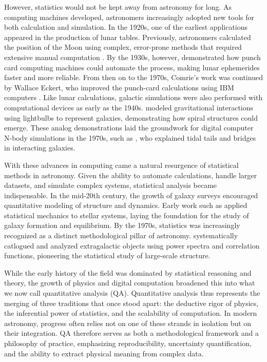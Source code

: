 \documentclass[preprint,longauthor]{aastex631}
\numberwithin{equation}{section}
\begin{document}
However, statistics would not be kept away from astronomy for long. As computing machines developed, astronomers increasingly adopted new tools for both calculation and simulation. In the 1920s, one of the earliest applications appeared in the production of lunar tables. Previously, astronomers calculated the position of the Moon using complex, error-prone methods that required extensive manual computation \citep{duncombeEarlyApplicationsComputer1988}. By the 1930s, however, \citet{comrieApplicationHollerithTabulating1932} demonstrated how punch card computing machines could automate the process, making lunar ephemerides faster and more reliable. From then on to the 1970s, Comrie's work was continued by Wallace Eckert, who improved the punch-card calculations using IBM computers \citep{olleyTaskThatExceeded2018}. Like lunar calculations, galactic simulations were also performed with computational devices as early as the 1940s. \citet{holmbergClusteringTendenciesNebulae1940} modeled gravitational interactions using lightbulbs to represent galaxies, demonstrating how spiral structures could emerge. These analog demonstrations laid the groundwork for digital computer N-body simulations in the 1970s, such as \citet{toomreGalacticBridgesTails1972}, who explained tidal tails and bridges in interacting galaxies.

With these advances in computing came a natural resurgence of statistical methods in astronomy. Given the ability to automate calculations, handle larger datasets, and simulate complex systems, statistical analysis became indispensable. In the mid-20th century, the growth of galaxy surveys encouraged quantitative modeling of structure and dynamics. Early work such as \citet{lynden-bellStatisticalMechanicsViolent1967} applied statistical mechanics to stellar systems, laying the foundation for the study of galaxy formation and equilibrium. By the 1970s, statistics was increasingly recognized as a distinct methodological pillar of astronomy. \citet{peeblesStatisticalAnalysisCatalogs1973} systematically catlogued and analyzed extragalactic objects using power spectra and correlation functions, pioneering the statistical study of large-scale structure.

While the early history of the field was dominated by statistical reasoning and theory, the growth of physics and digital computation broadened this into what we now call quantitative analysis (QA). Quantitative analysis thus represents the merging of three traditions that once stood apart: the deductive rigor of physics, the inferential power of statistics, and the scalability of computation. In modern astronomy, progress often relies not on one of these strands in isolation but on their integration. QA therefore serves as both a methodological framework and a philosophy of practice, emphasizing reproducibility, uncertainty quantification, and the ability to extract physical meaning from complex data.
\end{document}
